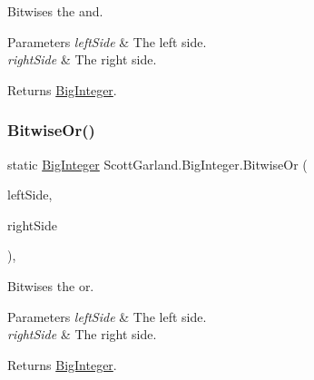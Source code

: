 Bitwises the and. 


\begin{DoxyParams}{Parameters}
{\em left\+Side} & The left side.\\
\hline
{\em right\+Side} & The right side.\\
\hline
\end{DoxyParams}
\begin{DoxyReturn}{Returns}
\hyperlink{class_scott_garland_1_1_big_integer}{Big\+Integer}.
\end{DoxyReturn}
\mbox{\label{class_scott_garland_1_1_big_integer_a6ef707f9d6bdf4add7be91ab89a7ac05}} 
\subsubsection{\texorpdfstring{Bitwise\+Or()}{BitwiseOr()}}
{\footnotesize\ttfamily static \hyperlink{class_scott_garland_1_1_big_integer}{Big\+Integer} Scott\+Garland.\+Big\+Integer.\+Bitwise\+Or (\begin{DoxyParamCaption}\item[{\hyperlink{class_scott_garland_1_1_big_integer}{Big\+Integer}}]{left\+Side,  }\item[{\hyperlink{class_scott_garland_1_1_big_integer}{Big\+Integer}}]{right\+Side }\end{DoxyParamCaption})\hspace{0.3cm}{\ttfamily [inline]}, {\ttfamily [static]}}



Bitwises the or. 


\begin{DoxyParams}{Parameters}
{\em left\+Side} & The left side.\\
\hline
{\em right\+Side} & The right side.\\
\hline
\end{DoxyParams}
\begin{DoxyReturn}{Returns}
\hyperlink{class_scott_garland_1_1_big_integer}{Big\+Integer}.
\end{DoxyReturn}
\mbox{\label{class_scott_garland_1_1_big_integer_a3724ad4d98940f216c8abce7834d5bf4}} 
